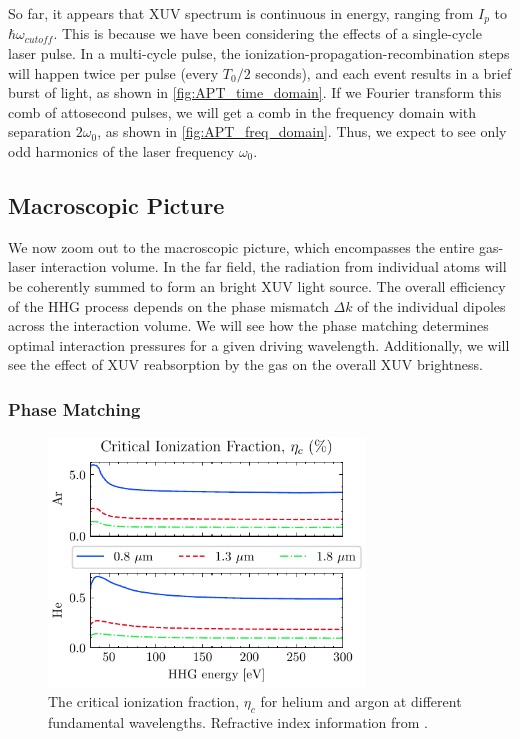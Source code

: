 So far, it appears that XUV spectrum is continuous in energy, ranging from $I_p$ to $\hbar \omega_{cutoff}$. This is because we have been considering the effects of a single-cycle laser pulse. In a multi-cycle pulse, the ionization-propagation-recombination steps will happen twice per pulse (every $T_0/2$ seconds), and each event results in a brief burst of light, as shown in \cref{fig:APT_time_domain}. If we Fourier transform this comb of attosecond pulses, we will get a comb in the frequency domain with separation $2 \omega_0$, as shown in \cref{fig:APT_freq_domain}. Thus, we expect to see only odd harmonics of the laser frequency $\omega_0$.

\subsection{Macroscopic Picture}

We now zoom out to the macroscopic picture, which encompasses the entire gas-laser interaction volume. In the far field, the radiation from individual atoms will be coherently summed to form an bright XUV light source. The overall efficiency of the HHG process depends on the phase mismatch $\Delta k$ of the individual dipoles across the interaction volume. We will see how the phase matching determines optimal interaction pressures for a given driving wavelength. Additionally, we will see the effect of XUV reabsorption by the gas on the overall XUV brightness.

\subsubsection{Phase Matching}

\begin{figure}
	\centering
	\includegraphics[width=0.75\textwidth]{figures/chap1/crit_ion_frac.pdf}
	\caption{The critical ionization fraction, $\eta_c$ for helium and argon at different fundamental wavelengths. Refractive index information from \cite{gulliksonCXROXRayInteractions,peckDispersionArgon1964,mansfieldDispersionHelium1969}.}
	\label{fig:crit_ion_frac}
\end{figure}

